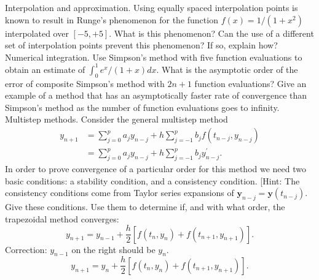 \documentclass[14pt]{extarticle}
\begin{document}
\newpage
Interpolation and approximation. Using equally spaced interpolation points is known to result in Runge's phenomenon for the function $f(x)=1 /\left(1+x^{2}\right)$ interpolated over $[-5,+5]$. What is this phenomenon? Can the use of a different set of interpolation points prevent this phenomenon? If so, explain how?
\newpage
 Numerical integration. Use Simpson's method with five function evaluations to obtain an estimate of $\int_{0}^{1} e^{x} /(1+x) d x$. What is the asymptotic order of the error of composite Simpson's method with $2 n+1$ function evaluations? Give an example of a method that has an asymptotically faster rate of convergence than Simpson's method as the number of function evaluations goes to infinity.
\newpage
 Multistep methods. Consider the general multistep method
$$
\begin{aligned}
y_{n+1} &=\sum_{j=0}^{p} a_{j} y_{n-j}+h \sum_{j=-1}^{p} b_{j} f\left(t_{n-j}, y_{n-j}\right) \\
&=\sum_{j=0}^{p} a_{j} y_{n-j}+h \sum_{j=-1}^{p} b_{j} y_{n-j}^{\prime} .
\end{aligned}
$$
In order to prove convergence of a particular order for this method we need two basic conditions: a stability condition, and a consistency condition. [Hint: The consistency conditions come from Taylor series expansions of $\boldsymbol{y}_{n-j}=\boldsymbol{y}\left(t_{n-j}\right)$. Give these conditions. Use them to determine if, and with what order, the trapezoidal method converges:
$$
y_{n+1}=y_{n-1}+\frac{h}{2}\left[f\left(t_{n}, y_{n}\right)+f\left(t_{n+1}, y_{n+1}\right)\right] .
$$
Correction: $y_{n-1}$ on the right should be $y_{n}$.
$$
y_{n+1}=y_{n}+\frac{h}{2}\left[f\left(t_{n}, y_{n}\right)+f\left(t_{n+1}, y_{n+1}\right)\right] .
$$
\end{document}
